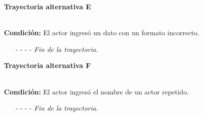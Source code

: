 \hypertarget{CU10-1:TAE}{\textbf{Trayectoria alternativa E}}\\
\noindent \textbf{Condición:} El actor ingresó un dato con un formato incorrecto.
\begin{enumerate}
	\UCpaso[\UCsist] Muestra el mensaje  señalando el campo que presenta el error en la pantalla .
	\UCpaso Regresa al paso \ref{CU10.1-P4} de la trayectoria principal.
	\item[- -] - - {\em {Fin de la trayectoria}}.
\end{enumerate}
\hypertarget{CU10-1:TAF}{\textbf{Trayectoria alternativa F}}\\
\noindent \textbf{Condición:} El actor ingresó el nombre de un actor repetido.
\begin{enumerate}
	\UCpaso[\UCsist] Muestra el mensaje  señalando el campo que presenta la duplicidad en la pantalla .
	\UCpaso Regresa al paso \ref{CU10.1-P4} de la trayectoria principal.
	\item[- -] - - {\em {Fin de la trayectoria}}.
\end{enumerate}
